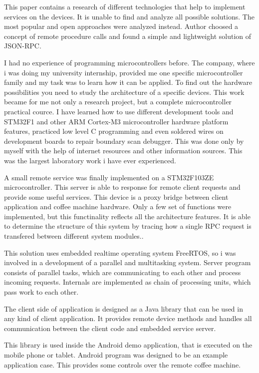 This paper contains a research of different technologies that help to implement
services on the devices.
It is unable to find and analyze all possible solutions. The most popular and
open approaches were analyzed instead. 
Author choosed a concept of remote procedure calls and found a simple
and lightweight solution of JSON-RPC. 

I had no experience of programming microcontrollers before. The company, where i
was doing my university internship, provided me one specific microcontroller
family and my task was to learn how it can be applied. To find out the
hardware possibilities you need to study the  architecture of a specific
devices.
This work became for me not only a research project, but  a complete
microcontroller practical cource.
I have learned how to use different development tools and STM32F1 and other ARM
Cortex-M3 microcontroller hardware platform features, practiced low level C
programming and even soldered wires on development boards to repair boundary
scan debugger.
This was done only by myself with the help of internet resources
and other information sources.
This was the largest laboratory work i have ever experienced.

A small remote service was finally implemented on a STM32F103ZE microcontroller. 
This server is able to response for remote client requests and provide some
useful services.
This device is a proxy bridge between client application and coffee machine
hardware.
Only a few set of functions were implemented, but this functinality reflects all
the architecture features.
It is able to determine the structure of this system by tracing how a
single RPC request is transfered between different system modules..

This solution uses embedded realtime operating system FreeRTOS, so i was
involved in a development of a parallel and multitasking system. 
Server program consists of parallel tasks, which are communicating to each other
and process incoming requests. Internals are implemented as chain of
processing units, which pass work to each other.

The client side of application is designed as a Java library that can be used
in any kind of client application. It provides remote device methods and handles
all communication between the client code and embedded service server.

This library  is used inside the Android demo application, that is executed on
the mobile phone or tablet.
Android program was designed to be an example application case. 
This provides some controls over the remote coffee machine. 


